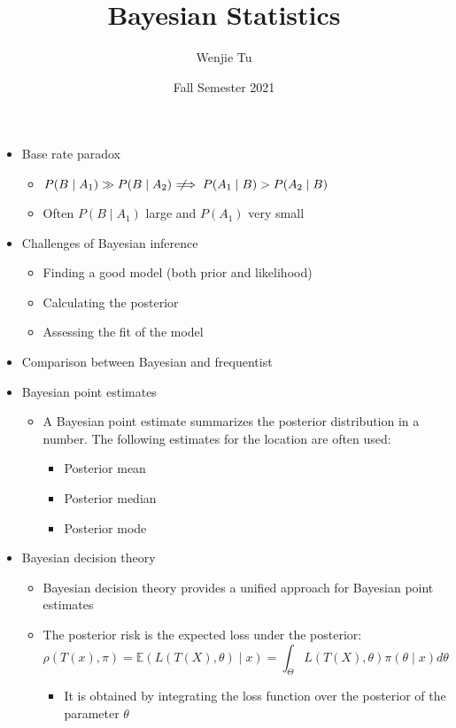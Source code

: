 \documentclass[a4paper]{article}
\title{%
    Bayesian Statistics
}
\author{Wenjie Tu}
\date{Fall Semester 2021}
\newcommand{\notimplies}{\;\not\!\!\!\implies}
\begin{document}
\maketitle

\begin{itemize}
    \item Base rate paradox
    \begin{itemize}
        \item $P(B\mid A_1)\gg P(B\mid A_2) \notimplies P(A_1\mid B)>P(A_2\mid B)$ 
        \item Often $P(B\mid A_1)$ large and $P(A_1)$ very small
    \end{itemize}
    \item Challenges of Bayesian inference
    \begin{itemize}
        \item Finding a good model (both prior and likelihood)
        \item Calculating the posterior
        \item Assessing the fit of the model
    \end{itemize}
    \item Comparison between Bayesian and frequentist
    \item Bayesian point estimates
    \begin{itemize}
        \item A Bayesian point estimate summarizes the posterior distribution in a number. The following estimates for the location are often used:
        \begin{itemize}
            \item Posterior mean
            \item Posterior median
            \item Posterior mode
        \end{itemize}
    \end{itemize}
    \item Bayesian decision theory
    \begin{itemize}
        \item Bayesian decision theory provides a unified approach for Bayesian point estimates
        \item The posterior risk is the expected loss under the posterior:
        \[\rho(T(x),\pi)=\mathbb{E}(L(T(X),\theta)\mid x)=\int_{\Theta}L(T(X),\theta)\pi(\theta\mid x)d\theta \]
        \begin{itemize}
            \item It is obtained by integrating the loss function over the posterior of the parameter $\theta$

\end{itemize}
\end{itemize}
\end{itemize}
\end{document}

